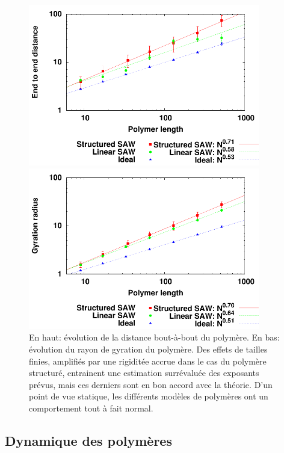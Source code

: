 \begin{figure}[H]
\begin{center}
\includegraphics[width=0.9\textwidth]{endtoenddistance.pdf}

\includegraphics[width=0.9\textwidth]{gyration.pdf}

\caption[Résultats numériques: caractéristiques statiques.]{En haut: évolution de la distance bout-à-bout du polymère. En bas: évolution du rayon de gyration du polymère. Des effets de tailles finies, amplifiés par une rigiditée accrue dans le cas du polymère structuré, entrainent une estimation surrévaluée des exposants prévus, mais ces derniers sont en bon accord avec la théorie. D'un point de vue statique, les différents modèles de polymères ont un comportement tout à fait normal.}
\label{statiquenum}
\end{center}
\end{figure}

\subsection{Dynamique des polymères}
